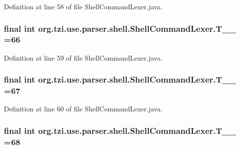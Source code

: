 Definition at line 58 of file Shell\-Command\-Lexer.\-java.

\hypertarget{classorg_1_1tzi_1_1use_1_1parser_1_1shell_1_1_shell_command_lexer_a9907e65fc1012ee55575690a50a7f3fe}{
\subsubsection[{T\-\_\-\-\_\-66}]{\setlength{\rightskip}{0pt plus 5cm}final int org.\-tzi.\-use.\-parser.\-shell.\-Shell\-Command\-Lexer.\-T\-\_\-\-\_ =66\hspace{0.3cm}{\ttfamily [static]}}}\label{classorg_1_1tzi_1_1use_1_1parser_1_1shell_1_1_shell_command_lexer_a9907e65fc1012ee55575690a50a7f3fe}


Definition at line 59 of file Shell\-Command\-Lexer.\-java.

\hypertarget{classorg_1_1tzi_1_1use_1_1parser_1_1shell_1_1_shell_command_lexer_a85078b5875fa94e11e4aee1bdce1c568}{
\subsubsection[{T\-\_\-\-\_\-67}]{\setlength{\rightskip}{0pt plus 5cm}final int org.\-tzi.\-use.\-parser.\-shell.\-Shell\-Command\-Lexer.\-T\-\_\-\-\_ =67\hspace{0.3cm}{\ttfamily [static]}}}\label{classorg_1_1tzi_1_1use_1_1parser_1_1shell_1_1_shell_command_lexer_a85078b5875fa94e11e4aee1bdce1c568}


Definition at line 60 of file Shell\-Command\-Lexer.\-java.

\hypertarget{classorg_1_1tzi_1_1use_1_1parser_1_1shell_1_1_shell_command_lexer_ad6d89e83ae33db663940dff0a600efa9}{
\subsubsection[{T\-\_\-\-\_\-68}]{\setlength{\rightskip}{0pt plus 5cm}final int org.\-tzi.\-use.\-parser.\-shell.\-Shell\-Command\-Lexer.\-T\-\_\-\-\_ =68\hspace{0.3cm}{\ttfamily [static]}}}\label{classorg_1_1tzi_1_1use_1_1parser_1_1shell_1_1_shell_command_lexer_ad6d89e83ae33db663940dff0a600efa9}



